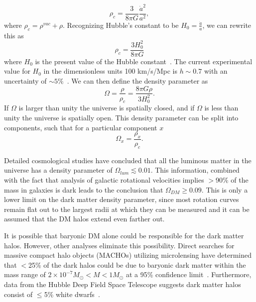 \begin{equation}\label{RhoC}
\rho_c = \frac{3}{8 \pi G}\frac{\dot{a}^2}{a^2},
\end{equation}
where $\rho_c = \rho^{vac}+\rho$.
Recognizing Hubble's constant to be $ H_0 = \frac { \dot{a}}{a} $, we can rewrite this as
\begin{equation}\label{RhoC2}
\rho_c =\frac{3H_0^2}{8 \pi G}
\end{equation}
where $H_0$ is the present value of the Hubble constant~\cite{Javorsek}. The current experimental value for $H_0$ in the dimensionless units 100 km/s/Mpc is $ h \sim 0.7 $ with an uncertainty of $\sim5\%$~\cite{Littleh}.  We can then define the density parameter as 
\begin{equation} \label{Omega}
\Omega=\frac{\rho}{\rho_c}=\frac{8 \pi G \rho}{3 H_0^2}.
\end{equation}
If $\Omega$ is larger than unity the universe is spatially closed, and if $\Omega$ is less than unity the universe is spatially open. This density parameter can be split into components, such that for a particular component $x$
\begin{equation} \label{OmegaComp}
\Omega_x = \frac{\rho_x}{\rho_c}.
\end{equation}

Detailed cosmological studies have concluded that all the luminous matter in the universe has a density parameter of $\Omega_{lum} \lesssim 0.01$.  This information, combined  with the fact that analysis of galactic rotational velocities implies $> $90\% of the mass in galaxies is dark leads to the conclusion that $\Omega_{DM} \geq 0.09$.  This is only a lower limit on the dark matter density parameter, since most rotation curves remain flat out to the largest radii at which they can be measured and it can be assumed that the DM halos extend even farther out.


It is possible that baryonic DM alone could be responsible for the dark matter halos.  However, other analyses eliminate this possibility. Direct searches for massive compact halo objects (MACHOs) utilizing microlensing have determined that $<$25\% of the dark halos could be due to baryonic dark matter within the mass range of $ 2 \times 10^{-7} M_{\odot} < M < 1 M_{\odot} $ at a 95\% confidence limit~\cite{EROS,Alcock}. Furthermore, data from the Hubble Deep Field Space Telescope suggests dark matter halos consist of $\leq$5\% white dwarfs~\cite{HubbleConstraints}.

